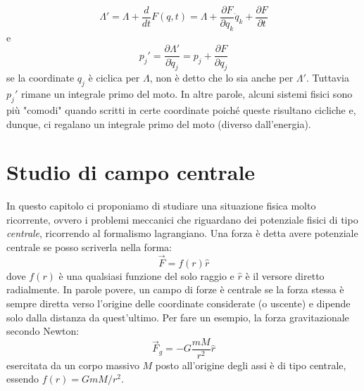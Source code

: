 \documentclass[a4paper,openany]{article}
\begin{document}
	$$
	\Lambda' = \Lambda + \dfrac{d}{dt}F(q,t) = \Lambda + \dfrac{\partial F}{\partial q_{k}}\dot{q}_{k} + \dfrac{\partial F}{\partial t}
	$$
	e
	$$
	p_{j}' = \dfrac{\partial \Lambda'}{\partial \dot{q}_{j}} = p_{j} + \dfrac{\partial F}{\partial q_{j}}
	$$
	se la coordinate $q_{j}$ è ciclica per $\Lambda$, non è detto che lo sia anche per $\Lambda'$. Tuttavia $p_{j}'$ rimane un integrale primo del moto. In altre parole, alcuni sistemi fisici sono più "comodi" quando scritti in certe coordinate poiché queste risultano cicliche e, dunque, ci regalano un integrale primo del moto (diverso dall'energia).
	\newpage
	\section{Studio di campo centrale}
	In questo capitolo ci proponiamo di studiare una situazione fisica molto ricorrente, ovvero i problemi meccanici che riguardano dei potenziale fisici di tipo \textit{centrale}, ricorrendo al formalismo lagrangiano.
	Una forza è detta avere potenziale centrale se posso scriverla nella forma:
	\begin{equation}
		\vec{F} = f(r)\hat{r}
	\end{equation}
	dove $f(r)$ è una qualsiasi funzione del solo raggio e $\hat{r}$ è il versore diretto radialmente. In parole povere, un campo di forze è centrale se la forza stessa è sempre diretta verso l'origine delle coordinate considerate (o uscente) e dipende solo dalla distanza da quest'ultimo. Per fare un esempio, la forza gravitazionale secondo Newton:
	$$
	\vec{F}_{g} = -G\dfrac{mM}{r^{2}}\hat{r}
	$$
	esercitata da un corpo massivo $M$ posto all'origine degli assi è di tipo centrale, essendo $f(r) =GmM/r^{2}$.
	
\end{document}
